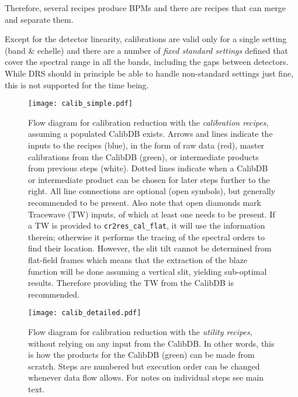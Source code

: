 Therefore, several recipes produce BPMs and there are recipes that can merge
and separate them.

Except for the detector linearity, calibrations are valid only for a
single setting (band \& echelle) and there are a number of \textit{fixed
standard settings} defined that cover the spectral range in all the bands,
including the gaps between detectors. While DRS should in principle be able to
handle non-standard settings just fine, this is not supported for the time
being.


\begin{figure}[!tb]
    \begin{center}
        \texttt{[image: calib\_simple.pdf]}
    \end{center}
    \caption{
        \label{fig:calibflow_simple}
        Flow diagram for calibration reduction with the \textit{calibration
        recipes}, assuming a populated CalibDB exists. Arrows and lines
        indicate the inputs to the recipes (blue), in the form of raw data
        (red), master calibrations from the CalibDB (green), or intermediate
        products from previous steps (white). Dotted lines indicate when a
        CalibDB or intermediate product can be chosen for later steps
        further to the right. All line connections are optional (open
        symbols), but generally recommended to be present. Also note that
        open diamonds mark Tracewave (TW) inputs, of which at least one
        needs to be present.
        \newline
        If a TW is provided to \texttt{cr2res\_cal\_flat}, it will use the
        information therein; otherwise it performs the tracing of the spectral
        orders to find their location. However, the slit tilt cannot be
        determined from flat-field frames which means that the extraction of the
        blaze function will be done assuming a vertical slit, yielding
        sub-optimal results. Therefore providing the TW from the CalibDB is
        recommended.
    }
\end{figure}


\begin{figure}[!tb]
    \begin{center}
        \texttt{[image: calib\_detailed.pdf]}
    \end{center}
    \caption{
        \label{fig:calibflow_detailed}
        Flow diagram for calibration reduction with the \textit{utility
            recipes},
        without relying on any input from the CalibDB. In other words, this is
        how the products for the CalibDB (green) can be made from scratch.
        Steps
        are
        numbered but execution order can be changed whenever data flow allows.
        For
        notes on individual steps see main text.
    }
\end{figure}

